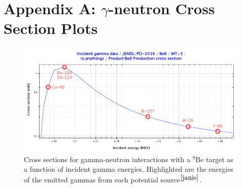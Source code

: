 \documentclass[%
12pt,
twoside,
reprint,
amsmath,amssymb,
aps,
]{article}
\begin{document}
%

	\section*{Appendix A: $\gamma$-neutron Cross Section Plots}
	
	\begin{figure}[H]
		\includegraphics[scale = 2.5, center]{Images/be_plot.png}
		\caption{\label{tab:table-name} Cross sections for gamma-neutron interactions with a $^{9}$Be target as a function of incident gamma energies. Highlighted are the energies of the emitted gammas from each potential source$^{\cite{janis}}$.}
	\end{figure}
\end{document}
